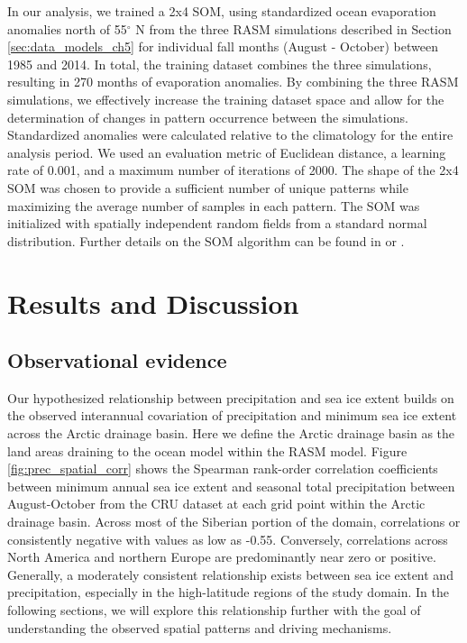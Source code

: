 In our analysis, we trained a 2x4 SOM, using standardized ocean evaporation anomalies north of 55$^{\circ}$ N from the three RASM simulations described in Section \ref{sec:data_models_ch5} for individual fall months (August - October) between 1985 and 2014.
In total, the training dataset combines the three simulations, resulting in 270 months of evaporation anomalies.
By combining the three RASM simulations, we effectively increase the training dataset space and allow for the determination of changes in pattern occurrence between the simulations.
Standardized anomalies were calculated relative to the climatology for the entire analysis period.
We used an evaluation metric of Euclidean distance, a learning rate of 0.001, and a maximum number of iterations of 2000.
The shape of the 2x4 SOM was chosen to provide a sufficient number of unique patterns while maximizing the average number of samples in each pattern.
The SOM was initialized with spatially independent random fields from a standard normal distribution.
Further details on the SOM algorithm can be found in \citet{Reusch_2005} or \citet{Cassano_2015}.

\section{Results and Discussion}
\label{sec:results_ch5}
\subsection{Observational evidence}
Our hypothesized relationship between precipitation and sea ice extent builds on the observed interannual covariation of precipitation and minimum sea ice extent across the Arctic drainage basin.
Here we define the Arctic drainage basin as the land areas draining to the ocean model within the RASM model.
Figure \ref{fig:prec_spatial_corr} shows the Spearman rank-order correlation coefficients between minimum annual sea ice extent and seasonal total precipitation between August-October from the CRU dataset at each grid point within the Arctic drainage basin.
Across most of the Siberian portion of the domain, correlations or consistently negative with values as low as -0.55.
Conversely, correlations across North America and northern Europe are predominantly near zero or positive.
Generally, a moderately consistent relationship exists between sea ice extent and precipitation, especially in the high-latitude regions of the study domain.
In the following sections, we will explore this relationship further with the goal of understanding the observed spatial patterns and driving mechanisms.

